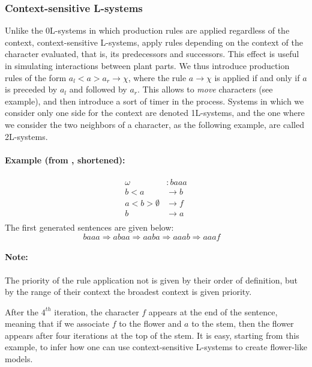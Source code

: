 \documentclass[10pt, letterpaper, twoside]{article}
\begin{document}
\begin{multicols}{2}
\subsubsection*{Context-sensitive L-systems}
Unlike the 0L-systems in which production rules are applied regardless of the
context, context-sensitive L-systems, apply rules depending on the context of
the character evaluated, that is, its predecessors and successors. This effect is
useful in simulating interactions between plant parts. We thus introduce
production rules of the form $a_l < a > a_r \rightarrow \chi$, where the rule $a
\rightarrow \chi$ is applied if and only if $a$ is preceded by $a_l$ and
followed by $a_r$. This allows to \textit{move} characters (see example), and
then introduce a sort of timer in the process. Systems in which we consider only
one side for the context are denoted 1L-systems, and the one where we consider
the two neighbors of a character, as the following example, are called
2L-systems.

\paragraph{Example (from \cite{TheAB}, shortened):}
\begin{equation}
    \begin{aligned}
        \omega & : baaa \\
        b<a & \rightarrow b\\
        a<b> \emptyset & \rightarrow f\\
        b & \rightarrow a \\
    \end{aligned}
\end{equation}
The first generated sentences are given below:
\begin{equation}
        baaa \Rightarrow %
        abaa \Rightarrow %
        aaba \Rightarrow %
        aaab \Rightarrow %
        aaaf \quad
\end{equation}

\paragraph{Note:} The priority of the rule application not is given by their
order of definition, but by the range of their context the broadest context is
given priority.

After the $4^{th}$ iteration, the character $f$ appears at the end of the
sentence, meaning that if we associate $f$ to the flower and $a$ to the stem,
then the flower appears after four iterations at the top of the stem. It is
easy, starting from this example, to infer how one can use context-sensitive
L-systems to create flower-like models.


\end{multicols}
\end{document}
